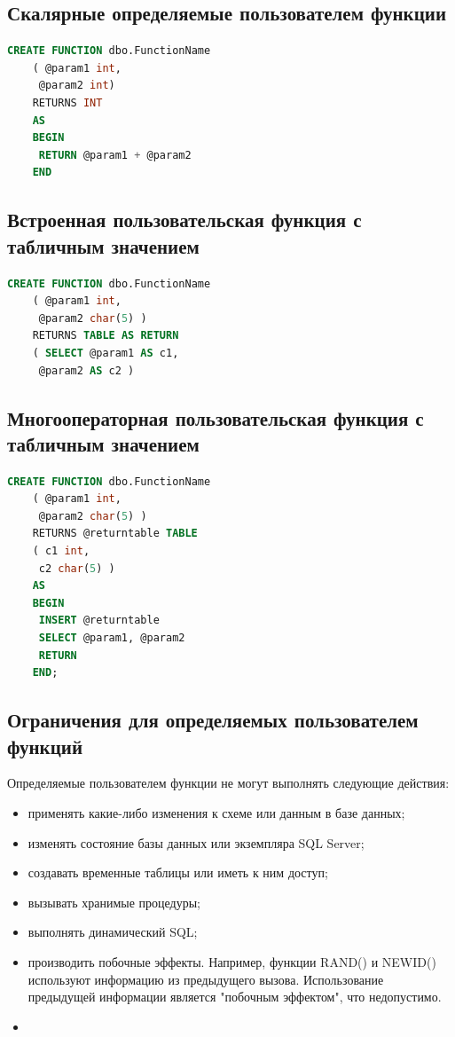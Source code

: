\subsection{Скалярные определяемые пользователем функции}


\begin{lstlisting}[label=lst:funcReturn, language=sql]
	CREATE FUNCTION dbo.FunctionName
	( @param1 int,
	 @param2 int)
	RETURNS INT
	AS
	BEGIN
	 RETURN @param1 + @param2
	END 
\end{lstlisting}



\subsection{Встроенная пользовательская функция с табличным значением}

\begin{lstlisting}[label=lst:funcReturn, language=sql]
	CREATE FUNCTION dbo.FunctionName
	( @param1 int,
	 @param2 char(5) )
	RETURNS TABLE AS RETURN
	( SELECT @param1 AS c1,
	 @param2 AS c2 )
\end{lstlisting}



\subsection{Многооператорная пользовательская функция с табличным значением}

\begin{lstlisting}[label=lst:funcReturn, language=sql]
	CREATE FUNCTION dbo.FunctionName
	( @param1 int,
	 @param2 char(5) )
	RETURNS @returntable TABLE
	( c1 int,
	 c2 char(5) )
	AS
	BEGIN
	 INSERT @returntable
	 SELECT @param1, @param2
	 RETURN
	END;
\end{lstlisting}


\subsection{Ограничения для определяемых пользователем функций}

Определяемые пользователем функции не могут выполнять следующие действия: 
\begin{itemize}
	\item применять какие-либо изменения к схеме или данным в базе данных; 
	\item изменять состояние базы данных или экземпляра SQL Server; 
	\item создавать временные таблицы или иметь к ним доступ; 
	\item вызывать хранимые процедуры; 
	\item выполнять динамический SQL; 
	\item производить побочные эффекты. Например, функции RAND() и NEWID() используют информацию из предыдущего вызова. Использование предыдущей информации является "побочным эффектом", что недопустимо. 
	\item 
\end{itemize}


